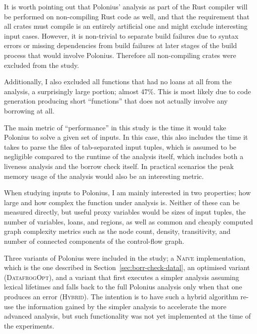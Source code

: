\documentclass[11pt,a4paper,twoside,openany]{report}
\begin{document}
It is worth pointing out that Polonius' analysis as part of the Rust compiler
will be performed on non-compiling Rust code as well, and that the requirement
that all crates must compile is an entirely artificial one and might exclude
interesting input cases. However, it is non-trivial to separate build failures
due to syntax errors or missing dependencies from build failures at later stages
of the build process that would involve Polonius. Therefore all non-compiling
crates were excluded from the study.

Additionally, I also excluded all functions that had no loans at all from the
analysis, a surprisingly large portion; almost 47\%. This is most likely due to
code generation producing short ``functions'' that does not actually involve any
borrowing at all.

The main metric of ``performance'' in this study is the time it would take
Polonius to solve a given set of inputs. In this case, this also includes the
time it takes to parse the files of tab-separated input tuples, which is assumed
to be negligible compared to the runtime of the analysis itself, which includes
both a liveness analysis and the borrow check itself. In practical scenarios the
peak memory usage of the analysis would also be an interesting metric.

When studying inputs to Polonius, I am mainly interested in two properties; how
large and how complex the function under analysis is. Neither of these can be
measured directly, but useful proxy variables would be sizes of input tuples,
the number of variables, loans, and regions, as well as common and cheaply
computed graph complexity metrics such as the node count, density, transitivity,
and number of connected components of the control-flow graph.

Three variants of Polonius were included in the study; a \textsc{Naive}
implementation, which is the one described in
Section~\ref{sec:borr-check-datal}, an optimised variant (\textsc{DatafrogOpt}),
and a variant that first executes a simpler analysis assuming lexical lifetimes
and falls back to the full Polonius analysis only when that one produces an
error (\textsc{Hybrid}). The intention is to have such a hybrid algorithm re-use
the information gained by the simpler analysis to accelerate the more advanced
analysis, but such functionality was not yet implemented at the time of the
experiments.
\end{document}
